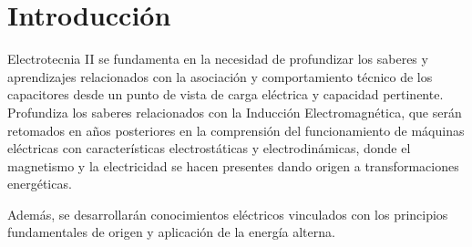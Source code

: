 \documentclass[../main]{subfiles}
\begin{document}
\chapter*{Introducción}

Electrotecnia II se fundamenta en la necesidad de profundizar 
los saberes y aprendizajes relacionados con la asociación y comportamiento técnico de los capacitores desde un punto de vista de carga eléctrica y capacidad pertinente. 
Profundiza los saberes relacionados con la Inducción Electromagnética, que serán retomados en años posteriores en la comprensión del funcionamiento de máquinas eléctricas con características electrostáticas y electrodinámicas, donde el magnetismo y la electricidad se hacen presentes dando origen a transformaciones energéticas. 

Además, se desarrollarán conocimientos eléctricos vinculados con los principios fundamentales de origen y aplicación de la energía alterna. 
\end{document}
